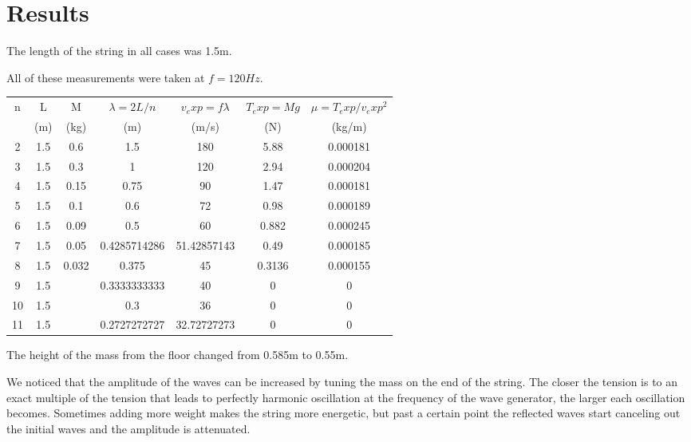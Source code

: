 \documentclass[]{article}
\begin{document}
\section{Results}

The length of the string in all cases was 1.5m.
\newline

All of these measurements were taken at $f=120Hz$.
\newline
\newline

\begin{tabular}{ccccccc}

n & L & M & $\lambda=2L/n$ & $v_exp=fλ$ & $T_exp=Mg$ & $\mu=T_exp/v_exp^2$ \\

& (m) & (kg) & (m) & (m/s) & (N) & (kg/m) \\

2 & 1.5 & 0.6 & 1.5 & 180 & 5.88 & 0.000181 \\

3 & 1.5 & 0.3 & 1 & 120 & 2.94 & 0.000204 \\

4 & 1.5 & 0.15 & 0.75 & 90 & 1.47 & 0.000181 \\

5 & 1.5 & 0.1 & 0.6 & 72 & 0.98 & 0.000189 \\

6 & 1.5 & 0.09 & 0.5 & 60 & 0.882 & 0.000245 \\

7 & 1.5 & 0.05 & 0.4285714286 & 51.42857143 & 0.49 & 0.000185 \\

8 & 1.5 & 0.032 & 0.375 & 45 & 0.3136 & 0.000155 \\

9 & 1.5 & & 0.3333333333 & 40 & 0 & 0 \\

10 & 1.5 & & 0.3 & 36 & 0 & 0 \\

11 & 1.5 & & 0.2727272727 & 32.72727273 & 0 & 0 \\

\end{tabular}
\newline
\newline

The height of the mass from the floor changed from 0.585m to 0.55m. 
\newline

We noticed that the amplitude of the waves can be increased by tuning the mass on the end of the string. The closer the tension is to an exact multiple of the tension that leads to perfectly harmonic oscillation at the frequency of the wave generator, the larger each oscillation becomes. Sometimes adding more weight makes the string more energetic, but past a certain point the reflected waves start canceling out the initial waves and the amplitude is attenuated.
\end{document}
